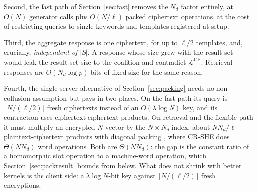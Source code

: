 \documentclass[a4paper,fleqn]{cas-dc}
\newcommand{\Leak}{\mathcal{L}}
\begin{document}
Second, the fast path of Section~\ref{sec:fast} removes the $N_d$ factor
entirely, at $O(N)$ generator calls plus $O(N/\ell)$ packed ciphertext
operations, at the cost of restricting queries to single keywords and
templates registered at setup.

Third, the aggregate response is one ciphertext, for up to $\ell/2$ templates,
and, crucially, \emph{independent of $|S|$}. A response whose size grew with the result set
would leak the result-set size to the coalition and contradict
$\Leak^{\text{CP}}$. Retrieval responses are $O(N_d\log p)$ bits of fixed size
for the same reason.

Fourth, the single-server alternative of Section~\ref{sec:packing} needs no
non-collusion assumption but pays in two places. On the fast path its query is
$\lceil N/(\ell/2)\rceil$ fresh ciphertexts instead of an $O(\lambda\log N)$
key, and its contraction uses ciphertext-ciphertext products. On retrieval and
the flexible path it must multiply an encrypted $N$-vector by the
$N\times N_d$ index, about $NN_d/\ell$ plaintext-ciphertext products with
diagonal packing \citep{halevi2014algorithms}, where CR-SHE does $\Theta(NN_d)$
word operations. Both are $\Theta(NN_d)$: the gap is the constant ratio of a
homomorphic slot operation to a machine-word operation, which
Section~\ref{sec:packresult} bounds from below. What does not shrink with
better kernels is the client side: a $\lambda\log N$-bit key against
$\lceil N/(\ell/2)\rceil$ fresh encryptions.
\end{document}
